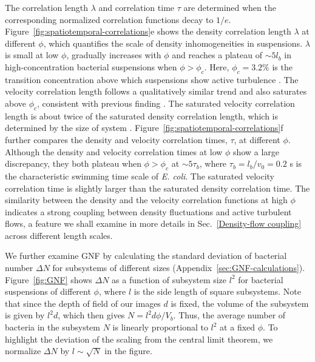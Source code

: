 \documentclass[twocolumn,aps,prx,amsmath,amssymb,longbibliography]{revtex4-2}
\begin{document}
The correlation length $\lambda$ and correlation time $\tau$ are determined when the corresponding normalized correlation functions decay to $1/e$. Figure~\ref{fig:spatiotemporal-correlations}e shows the density correlation length $\lambda$ at different $\phi$, which quantifies the scale of density inhomogeneities in suspensions.
$\lambda$ is small at low $\phi$, gradually increases with $\phi$ and reaches a plateau of $\sim 5l_b$ in high-concentration bacterial suspensions when $\phi > \phi_c$. Here, $\phi_c = 3.2\%$ is the transition concentration above which suspensions show active turbulence \cite{Peng2020}.
The velocity correlation length follows a qualitatively similar trend and also saturates above $\phi_c$, consistent with previous finding \cite{Sokolov2007}. The saturated velocity correlation length is about twice of the saturated density correlation length, which is determined by the size of system \cite{Guo2018}.  Figure~\ref{fig:spatiotemporal-correlations}f further compares the density and velocity correlation times, $\tau$, at different $\phi$. Although the density and velocity correlation times at low $\phi$ show a large discrepancy, they both plateau when $\phi > \phi_c$ at $\sim 5\tau_b$, where $\tau_b=l_b/v_0=0.2$ s is the characteristic swimming time scale of \textit{E. coli}. The saturated velocity correlation time is slightly larger than the saturated density correlation time. The similarity between the density and the velocity correlation functions at high $\phi$ indicates a strong coupling between density fluctuations and active turbulent flows, a feature we shall
examine in more details in Sec.~\ref{Density-flow coupling} across different length scales.


We further examine GNF by calculating the standard deviation of bacterial number $\Delta N$ for subsystems of different sizes (Appendix~\ref{sec:GNF-calculations}). Figure~\ref{fig:GNF} shows $\Delta N$ as a function of subsystem size $l^2$ for bacterial suspensions of different $\phi$, where $l$ is the side length of square subsystems. Note that since the depth of field of our images $d$ is fixed, the volume of the subsystem is given by $l^2 d$, which then gives $N = l^2d \phi/V_b$. Thus, the average number of bacteria in the subsystem $N$ is linearly proportional to $l^2$ at a fixed $\phi$. To highlight the deviation of the scaling from the central limit theorem, we normalize $\Delta N$ by $l \sim \sqrt N$ in the figure.
\end{document}
